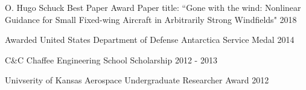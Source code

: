 
\begin{cvhonors}

  \cvawardentry
    {O. Hugo Schuck Best Paper Award \quad{}} %
    {Paper title: ``Gone with the wind: Nonlinear Guidance for Small Fixed-wing Aircraft in Arbitrarily Strong Windfields"} %
    {2018} %

  \cvawardentry
    {Awarded United States Department of Defense Antarctica Service Medal} %
    {} %
    {2014} %

\vspace*{-9pt}

%
  \cvawardentry
    {C\&C Chaffee Engineering School Scholarship} %
    {} %
    {2012 - 2013} %

\vspace*{-9pt}

  \cvawardentry
    {Univserity of Kansas Aerospace Undergraduate Researcher Award} %
    {} %
    {2012} %

\end{cvhonors}
